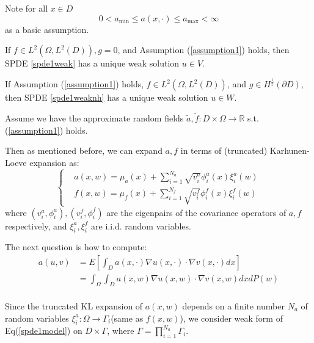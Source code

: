 \begin{theorem}
    Note for all $x\in D$
    \begin{equation}\label{assumption1}
        0<a_{\min}\leq a(x, \cdot)\leq a_{\max}<\infty
    \end{equation} as a basic assumption.

    If $f\in L^2(\Omega, L^2(D)),g=0$, and Assumption (\ref{assumption1}) holds, then SPDE \ref{spde1weak} has a unique weak solution $u\in V$.

    If Assumption (\ref{assumption1}) holds, $f\in L^2(\Omega, L^2(D))$, and $g\in H^{\frac{1}{2}}(\partial D)$, 
    then SPDE \ref{spde1weaknh} has a unique weak solution $u\in W$.
\end{theorem}

Assume we have the approximate random fields $\tilde{a}, \tilde{f}: D\times \Omega \to \mathbb{R}$ s.t. (\ref{assumption1}) holds.

Then as mentioned before, we can expand $a, f$ in terms of (truncated) Karhunen-Loeve expansion as:
\begin{equation}\left\{
    \begin{aligned}
        &a(x, w) = \mu_a(x) + \sum_{i=1}^{N_a}\sqrt{v_i^a}\phi_i^a(x)\xi_i^a(w)\\
        &f(x, w) = \mu_f(x) + \sum_{i=1}^{N_f}\sqrt{v_i^f}\phi_i^f(x)\xi_i^f(w)
    \end{aligned}\right.\label{expansion}
\end{equation}
where $(v_i^a, \phi_i^a), (v_i^f, \phi_i^f)$ are the eigenpairs of the covariance operators of $a, f$ respectively, 
and $\xi_i^a, \xi_i^f$ are i.i.d. random variables.

The next question is how to compute:
\begin{equation}
    \begin{aligned}
        a(u, v) &= E\left[\int_D a(x, \cdot)\nabla u(x, \cdot)\cdot \nabla v(x, \cdot)dx\right]\\
        &=\int_\Omega \int_D a(x, w)\nabla u(x, w)\cdot \nabla v(x, w)dxdP(w)\\
    \end{aligned}
\end{equation}

Since the truncated KL expansion of $a(x, w)$ depends on a finite number $N_a$ of random variables $\xi_i^a:\Omega\to \Gamma_i$(same as $f(x,w)$), 
we consider weak form of Eq(\ref{spde1model}) on $D\times \Gamma$, where $\Gamma = \prod_{i=1}^{N_a}\Gamma_i$.

